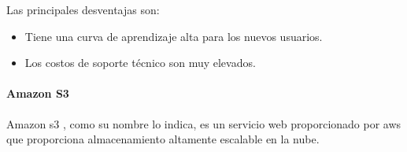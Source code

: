 \documentclass[12pt, a4paper, titlepage]{report}
\begin{document}
		   	Las principales desventajas son: 
		   	\begin{itemize}
		   		\item Tiene una curva de aprendizaje alta para los nuevos usuarios.
		   		\item Los costos de soporte técnico son muy elevados.
		   	\end{itemize}		

		   	\paragraph{Amazon S3 \\}
		   	Amazon \acrfull{s3} \cite{amazon_s3}, como su nombre lo indica, es un servicio web proporcionado por \acrfull{aws} que proporciona almacenamiento altamente escalable en la nube. 
		   	
\end{document}
